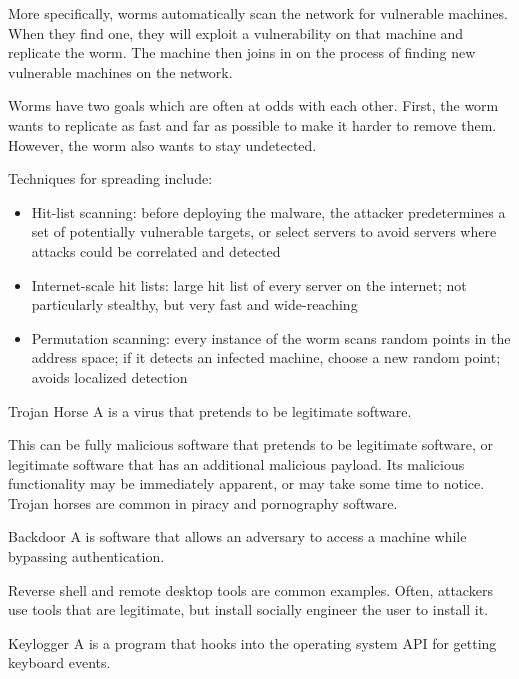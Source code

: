 More specifically, worms automatically scan the network for vulnerable machines. When they find one, they will exploit a vulnerability on that machine and replicate the worm. The machine then joins in on the process of finding new vulnerable machines on the network.

Worms have two goals which are often at odds with each other. First, the worm wants to replicate as fast and far as possible to make it harder to remove them. However, the worm also wants to stay undetected.

Techniques for spreading include:
\begin{itemize}
    \item Hit-list scanning: before deploying the malware, the attacker predetermines a set of potentially vulnerable targets, or select servers to avoid servers where attacks could be correlated and detected
    \item Internet-scale hit lists: large hit list of every server on the internet; not particularly stealthy, but very fast and wide-reaching
    \item Permutation scanning: every instance of the worm scans random points in the address space; if it detects an infected machine, choose a new random point; avoids localized detection
\end{itemize}

\begin{dfnbox}{Trojan Horse}{}
    A  is a virus that pretends to be legitimate software.
\end{dfnbox}

This can be fully malicious software that pretends to be legitimate software, or legitimate software that has an additional malicious payload. Its malicious functionality may be immediately apparent, or may take some time to notice. Trojan horses are common in piracy and pornography software.

\begin{dfnbox}{Backdoor}{}
    A  is software that allows an adversary to access a machine while bypassing authentication.
\end{dfnbox}

Reverse shell and remote desktop tools are common examples. Often, attackers use tools that are legitimate, but install socially engineer the user to install it.

\begin{dfnbox}{Keylogger}{}
    A  is a program that hooks into the operating system API for getting keyboard events.
\end{dfnbox}


